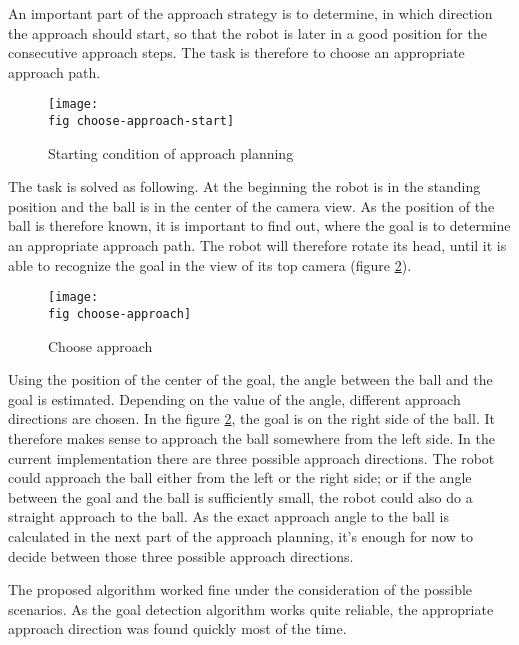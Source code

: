 An important part of the approach strategy is to determine, in which direction
the approach should start, so that the robot is later in a good position for
the consecutive approach steps. The task is therefore to choose an appropriate
approach path.


\begin{figure}[ht]
  \texttt{[image: \\fig choose-approach-start]}
  \caption{Starting condition of approach planning}
  \label{j figure starting condition choose-approach}
\end{figure}

The task is solved as following. At the beginning the robot is in the standing
position and the ball is in the center of the camera view. As the position of
the ball is therefore known, it is important to find out, where the goal is to
determine an appropriate approach path. The robot will therefore rotate its
head, until it is able to recognize the goal in the view of its top camera
(figure \ref{j figure choose-approach}).

\begin{figure}[ht]
  \texttt{[image: \\fig choose-approach]}
  \caption{Choose approach}
  \label{j figure choose-approach}
\end{figure}

Using the position of the center of the goal, the angle between the ball and
the goal is estimated. Depending on the value of the angle, different approach
directions are chosen. In the figure \ref{j figure choose-approach}, the goal
is on the right side of the ball. It therefore makes sense to approach the ball
somewhere from the left side. In the current implementation there are three
possible approach directions. The robot could approach the ball either from the
left or the right side; or if the angle between the goal and the ball is
sufficiently small, the robot could also do a straight approach to the ball. As
the exact approach angle to the ball is calculated in the next part of the
approach planning, it's enough for now to decide between those three possible
approach directions.

The proposed algorithm worked fine under the consideration of the
possible scenarios. As the goal detection algorithm works quite reliable, the
appropriate approach direction was found quickly most of the time.

\newpage

